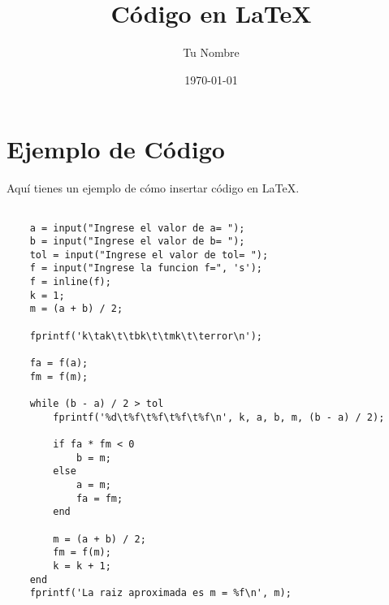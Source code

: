 \documentclass{article}
\begin{document}
\title{Código en \LaTeX}
\author{Tu Nombre}
\date{\today}
\maketitle

\section{Ejemplo de Código}

Aquí tienes un ejemplo de cómo insertar código en \LaTeX.

\begin{lstlisting}
   
    a = input("Ingrese el valor de a= ");
    b = input("Ingrese el valor de b= ");
    tol = input("Ingrese el valor de tol= ");
    f = input("Ingrese la funcion f=", 's');
    f = inline(f);  
    k = 1;          
    m = (a + b) / 2; 
    
    fprintf('k\tak\t\tbk\t\tmk\t\terror\n');
    
    fa = f(a);
    fm = f(m);
    
    while (b - a) / 2 > tol
        fprintf('%d\t%f\t%f\t%f\t%f\n', k, a, b, m, (b - a) / 2);
        
        if fa * fm < 0  
            b = m;      
        else
            a = m;      
            fa = fm;    
        end
        
        m = (a + b) / 2;
        fm = f(m); 
        k = k + 1;  
    end
    fprintf('La raiz aproximada es m = %f\n', m);
\end{lstlisting}
\end{document}
